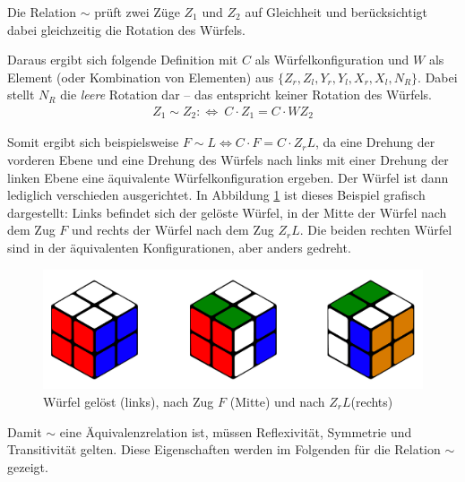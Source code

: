 \documentclass[12pt,a4paper, usenames, dvipsnames]{article}
\theoremstyle{mystyle}
\theoremstyle{definition}
\begin{document}
Die Relation $\sim$ prüft zwei Züge $Z_1$ und $Z_2$ auf Gleichheit und berücksichtigt dabei gleichzeitig die Rotation des Würfels.

Daraus ergibt sich folgende Definition mit $C$ als Würfelkonfiguration und $W$ als Element (oder Kombination von Elementen) aus $\{{Z_r}, {Z_l}, {Y_r}, {Y_l}, {X_r}, {X_l}, N_R\}$. Dabei stellt $N_R$ die \textit{leere} Rotation dar -- das entspricht keiner Rotation des Würfels. 
\begin{align*}
Z_1 \sim Z_2 :\Leftrightarrow \ C \cdot Z_1 = C \cdot WZ_2
\end{align*}

Somit ergibt sich beispielsweise $F \sim L \Leftrightarrow C \cdot F = C \cdot Z_rL$, da eine Drehung der vorderen Ebene und eine Drehung des Würfels nach links mit einer Drehung der linken Ebene eine äquivalente Würfelkonfiguration ergeben. Der Würfel ist dann lediglich verschieden ausgerichtet. 
In Abbildung \ref{Abbildung_GelöstnachFnachZL} ist dieses Beispiel grafisch dargestellt: Links befindet sich der gelöste Würfel, in der Mitte der Würfel nach dem Zug $F$ und rechts der Würfel nach dem Zug $Z_rL$. Die beiden rechten Würfel sind in der äquivalenten Konfigurationen, aber anders gedreht.
\begin{figure}[h]
\centering
\includegraphics[scale=0.15]{3_wuerfel.png}
\caption[Würfel gelöst, nach Zug $F$ und nach $Z_rL$]{Würfel gelöst (links), nach Zug $F$ (Mitte) und nach $Z_rL$(rechts)}
\label{Abbildung_GelöstnachFnachZL}
\end{figure}

Damit $\sim$ eine Äquivalenzrelation ist, müssen Reflexivität, Symmetrie und Transitivität gelten. Diese Eigenschaften werden im Folgenden für die Relation $\sim$ gezeigt.
\end{document}
